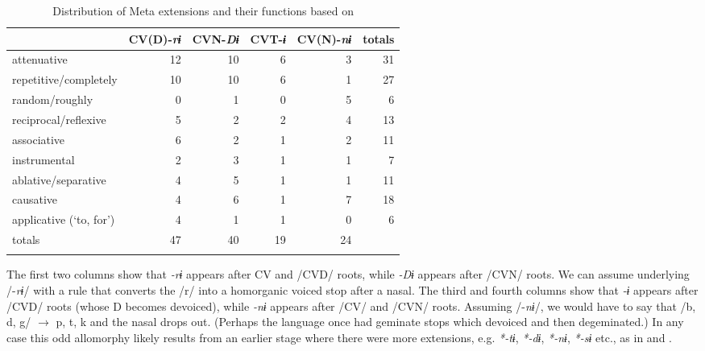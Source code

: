\documentclass[output=paper]{langsci/langscibook}
\begin{document}
\begin{table}
\caption{Distribution of Meta extensions and their functions based on \citet{Ngum2004}}
\label{extab:proto:23} 
\begin{tabularx}{\textwidth}{Xrrrrr} 
\lsptoprule
 & {{CV(D)-\textit{rɨ}}} & {{CVN-\textit{Dɨ}}} & {{CVT-\textit{ɨ}}} & {{CV(N)-\textit{nɨ}}} & totals\\
\midrule
 {attenuative} & 12 & 10 & 6 & 3 & 31\\
 {repetitive/completely} & 10 & 10 & 6 & 1 & 27\\
 {random/roughly} & 0 & 1 & 0 & 5 & 6\\
 {reciprocal/reflexive} & 5 & 2 & 2 & 4 & 13\\
 {associative} & 6 & 2 & 1 & 2 & 11\\
 {instrumental} & 2 & 3 & 1 & 1 & 7\\
 {ablative/separative} & 4 & 5 & 1 & 1 & 11\\
 {causative} & 4 & 6 & 1 & 7 & 18\\
 {applicative (‘to, for’)} & 4 & 1 & 1 & 0 & 6\\
\midrule
 {      totals} & {47} & {40} & {19} & {24} & \\
\lspbottomrule
\end{tabularx}
\end{table}

\noindent
The first two columns show that \textit{-rɨ} appears after CV and /CVD/ roots, while \textit{-Dɨ} appears after /CVN/ roots. We can assume underlying /-\textit{r}\textit{ɨ}/ with a rule that converts the /r/ into a homorganic voiced stop after a nasal. The third and fourth columns show that \textit{-ɨ} appears after /CVD/ roots (whose D becomes devoiced), while \textit{-nɨ} appears after /CV/ and /CVN/ roots. Assuming /-\textit{n}\textit{ɨ}/, we would have to say that /b, d, g/  ${\rightarrow}$ p, t, k and the nasal drops out. (Perhaps the language once had geminate stops which devoiced and then degeminated.) In any case this odd allomorphy likely results from an earlier stage where there were more extensions, e.g. \textit{*-tɨ}, \textit{*-dɨ}, \textit{*-nɨ}, \textit{*-sɨ} etc., as in  and .
\end{document}
